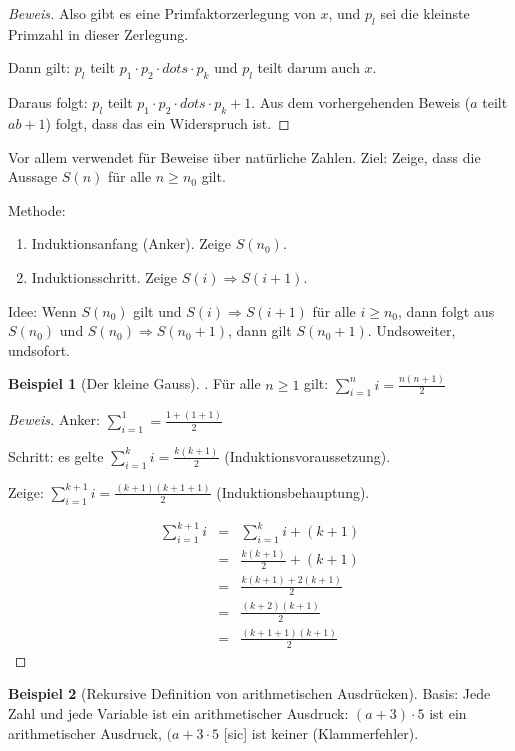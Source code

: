 \documentclass[11pt]{article} %
\theoremstyle{definition}
\newtheorem*{beispiel}{Beispiel}
\begin{document}
\begin{description}
\begin{proof}[Beweis]
Also gibt es eine Primfaktorzerlegung von $x$, und $p_l$ sei die kleinste Primzahl in dieser Zerlegung.

Dann gilt: $p_l$ teilt $p_1\cdot p_2 \cdot dots \cdot p_k$ und $p_l$ teilt darum auch $x$.

Daraus folgt: $p_l$ teilt  $p_1\cdot p_2 \cdot dots \cdot p_k+1$. Aus dem vorhergehenden Beweis ($a$ teilt $ab+1$) folgt, dass das ein Widerspruch ist.
\end{proof}

\item[Induktion] Vor allem verwendet für Beweise über natürliche Zahlen. Ziel: Zeige, dass die Aussage $S(n)$ für alle $n \ge n_0$ gilt.

Methode:
\begin{enumerate}
\item Induktionsanfang (Anker). Zeige $S(n_0)$.
\item Induktionsschritt. Zeige $S(i) \Rightarrow S(i+1)$.
\end{enumerate}

Idee: Wenn $S(n_0)$ gilt und $S(i) \Rightarrow S(i+1)$ für alle $i \ge n_0$, dann folgt aus $S(n_0)$ und $S(n_0) \Rightarrow S(n_0+1)$, dann gilt $S(n_0+1)$. Undsoweiter, undsofort.

\begin{beispiel}[Der kleine Gauss].
Für alle $n \ge 1$ gilt: $\sum\limits_{i=1}^n i = \frac {n(n+1)} 2$
\end{beispiel}
\begin{proof}[Beweis]
Anker: $\sum\limits_{i=1}^1 = \frac{1+(1+1)}2$

Schritt: es gelte $\sum\limits_{i=1}^k i = \frac{k(k+1)} 2$ (Induktionsvoraussetzung).

Zeige: $\sum\limits_{i=1}^{k+1} i = \frac{(k+1)(k+1+1)} 2$ (Induktionsbehauptung).

\begin{eqnarray*}
\sum\limits_{i=1}^{k+1} i &=& \sum\limits_{i=1}^{k} i + (k+1) \\
&=& \frac{k(k+1)} 2 + (k+1) \\
&=& \frac{k(k+1) + 2(k+1)}2 \\
&=& \frac{(k+2)(k+1)}2 \\
&=& \frac{(k+1+1)(k+1)}2
\end{eqnarray*}
\end{proof}

\item[Rekursive Definitionen und strukturelle Induktion]
\begin{beispiel}[Rekursive Definition von arithmetischen Ausdrücken]
Basis: Jede Zahl und jede Variable ist ein arithmetischer Ausdruck: $(a+3)\cdot 5$ ist ein arithmetischer Ausdruck, $(a +3\cdot 5$ [sic] ist keiner (Klammerfehler).


\end{beispiel}
\end{description}
\end{document}
